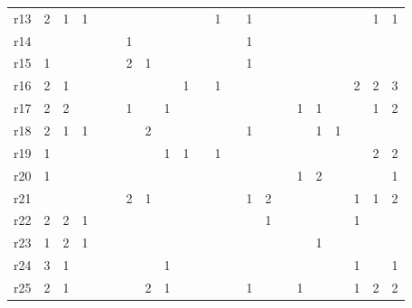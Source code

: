 {\begin{tabular}{l*{21}{r}}
r13& \cellcolor{magenta!10} 2& \cellcolor{magenta!10} 1& \cellcolor{magenta!10} 1& & & & & & & & \cellcolor{magenta!10} 1& & \cellcolor{magenta!10} 1& & & & & & & \cellcolor{magenta!10} 1& \cellcolor{magenta!10} 1\\ 
r14& & & & & & \cellcolor{cyan!10} 1& & & & & & & \cellcolor{cyan!10} 1& & & & & & & & \\ 
r15& \cellcolor{cyan!10} 1& & & & & \cellcolor{white} 2& \cellcolor{cyan!10} 1& & & & & & \cellcolor{cyan!10} 1& & & & & & & & \\ 
r16& \cellcolor{magenta!10} 2& \cellcolor{magenta!10} 1& & & & & & & \cellcolor{magenta!10} 1& & \cellcolor{magenta!10} 1& & & & & & & & \cellcolor{magenta!10} 2& \cellcolor{magenta!10} 2& \cellcolor{white} 3\\ 
r17& \cellcolor{magenta!10} 2& \cellcolor{magenta!10} 2& & & & \cellcolor{magenta!10} 1& & \cellcolor{magenta!10} 1& & & & & & & & \cellcolor{magenta!10} 1& \cellcolor{magenta!10} 1& & & \cellcolor{magenta!10} 1& \cellcolor{magenta!10} 2\\ 
r18& \cellcolor{cyan!10} 2& \cellcolor{cyan!10} 1& \cellcolor{cyan!10} 1& & & & \cellcolor{cyan!10} 2& & & & & & \cellcolor{cyan!10} 1& & & & \cellcolor{cyan!10} 1& \cellcolor{cyan!10} 1& & & \\ 
r19& \cellcolor{magenta!10} 1& & & & & & & \cellcolor{magenta!10} 1& \cellcolor{magenta!10} 1& & \cellcolor{magenta!10} 1& & & & & & & & & \cellcolor{white} 2& \cellcolor{white} 2\\ 
r20& \cellcolor{cyan!10} 1& & & & & & & & & & & & & & & \cellcolor{cyan!10} 1& \cellcolor{white} 2& & & & \cellcolor{cyan!10} 1\\ 
r21& & & & & & \cellcolor{white} 2& \cellcolor{magenta!10} 1& & & & & & \cellcolor{magenta!10} 1& \cellcolor{white} 2& & & & & \cellcolor{magenta!10} 1& \cellcolor{magenta!10} 1& \cellcolor{white} 2\\ 
r22& \cellcolor{white} 2& \cellcolor{white} 2& \cellcolor{cyan!10} 1& & & & & & & & & & & \cellcolor{cyan!10} 1& & & & & \cellcolor{cyan!10} 1& & \\ 
r23& \cellcolor{magenta!10} 1& \cellcolor{magenta!10} 2& \cellcolor{magenta!10} 1& & & & & & & & & & & & & & \cellcolor{magenta!10} 1& & & & \\ 
r24& \cellcolor{white} 3& \cellcolor{cyan!10} 1& & & & & & \cellcolor{cyan!10} 1& & & & & & & & & & & \cellcolor{cyan!10} 1& & \cellcolor{cyan!10} 1\\ 
r25& \cellcolor{magenta!10} 2& \cellcolor{magenta!10} 1& & & & & \cellcolor{magenta!10} 2& \cellcolor{magenta!10} 1& & & & & \cellcolor{magenta!10} 1& & & \cellcolor{magenta!10} 1& & & \cellcolor{magenta!10} 1& \cellcolor{magenta!10} 2& \cellcolor{magenta!10} 2\\ 

\end{tabular}}
